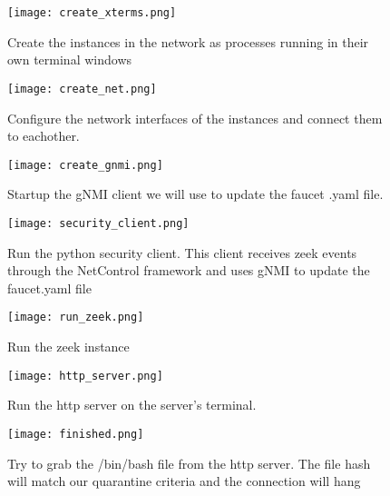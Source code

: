 \documentclass{article}
\begin{document}
\begin{figure}[h!]
\caption{Create the instances in the network as processes running in their own terminal windows}
\texttt{[image: create\_xterms.png]}
\end{figure}
\begin{figure}[h!]
\caption{Configure the network interfaces of the instances and connect them to eachother.}
\texttt{[image: create\_net.png]}
\end{figure}
\begin{figure}[h!]
\caption{Startup the gNMI client we will use to update the faucet .yaml file.}
\texttt{[image: create\_gnmi.png]}
\end{figure}
\begin{figure}[h!]
\caption{Run the python security client. This client receives zeek events through the NetControl framework and uses gNMI to update the faucet.yaml file}
\texttt{[image: security\_client.png]}
\end{figure}
\begin{figure}[h!]
\caption{Run the zeek instance}
\texttt{[image: run\_zeek.png]}
\end{figure}
\begin{figure}[h!]
\caption{Run the http server on the server's terminal.}
\texttt{[image: http\_server.png]}
\end{figure}
\begin{figure}[h!]
\caption{Try to grab the /bin/bash file from the http server. The file hash will match our quarantine criteria and the connection will hang}
\texttt{[image: finished.png]}
\end{figure}

\clearpage
\end{document}
